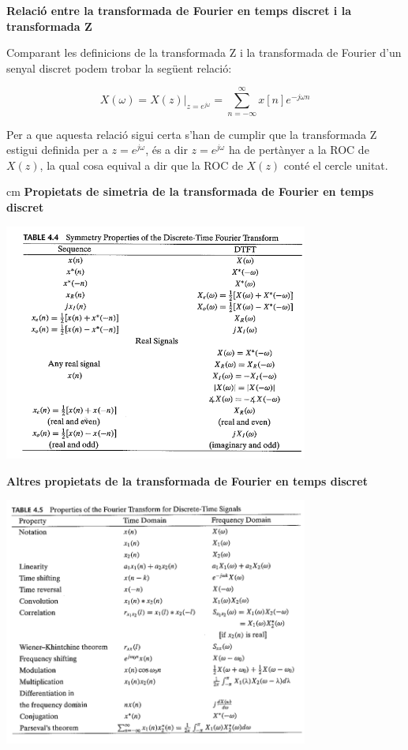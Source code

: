 \documentclass{article}
\begin{document}
\begin{description}
\newpage
\noindent
\textbf{Relaci\'o entre la transformada de Fourier en temps discret i la transformada Z}

\noindent
Comparant les definicions de la transformada Z i la transformada de Fourier d'un senyal discret
podem trobar la seg\"uent relaci\'o:

\[
X(\omega)=X(z)|_{z=e^{j\omega}}=\sum_{n=-\infty}^\infty x[n] e^{-j\omega n}
\]

\noindent
Per a que aquesta relaci\'o sigui certa s'han de cumplir que
la transformada Z estigui definida per a $z=e^{j\omega}$, \'es a dir $z=e^{j\omega}$ ha de pert\`anyer a la ROC
de $X(z)$, la qual cosa equival a dir que la ROC de $X(z)$ cont\'e el cercle unitat.

 cm
\noindent
\textbf{Propietats de simetria de la transformada de Fourier en temps discret}

\begin{center}
\includegraphics[width=10cm]{tabpropsimetria.png}
\end{center}


\newpage
\noindent
\textbf{Altres propietats de la transformada de Fourier en temps discret}

\begin{center}
\includegraphics[width=10cm]{tabpropTF.png}
\end{center}


\end{description}
\end{document}

